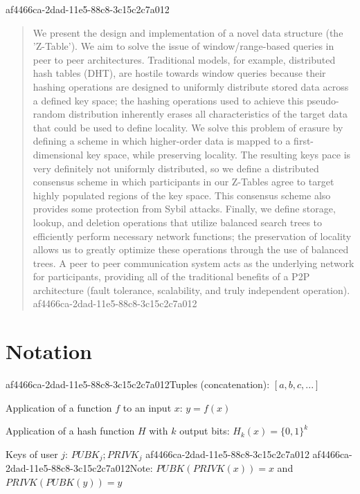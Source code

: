\documentclass[12pt]{article}
\begin{document}
af4466ca-2dad-11e5-88c8-3c15c2c7a012
\maketitle

\begin{abstract}
We present the design and implementation of a novel data structure (the 'Z-Table'). We aim to solve the issue of window/range-based queries in peer to peer architectures. Traditional models, for example,  distributed hash tables (DHT), are hostile towards window queries because their hashing operations are designed to uniformly distribute stored data across a defined key space; the hashing operations used to achieve this pseudo-random distribution inherently erases all characteristics of the target data that could be used to define locality. We solve this problem of erasure by defining a scheme in which higher-order data is mapped to a first-dimensional key space, while preserving locality. The resulting keys pace is very definitely not uniformly distributed, so we define a distributed consensus scheme in which participants in our Z-Tables agree to target highly populated regions of the key space. This consensus scheme also provides some protection from Sybil attacks. Finally, we define storage, lookup, and deletion operations that utilize balanced search trees to efficiently perform necessary network functions; the preservation of locality allows us to greatly optimize these operations through the use of balanced trees. A peer to peer communication system acts as the underlying network for participants, providing all of the traditional benefits of a P2P architecture (fault tolerance, scalability, and truly independent operation).
af4466ca-2dad-11e5-88c8-3c15c2c7a012\end{abstract}

\section{Notation}

af4466ca-2dad-11e5-88c8-3c15c2c7a012Tuples (concatenation): $[a,b,c,...]$

Application of a function $f$ to an input $x$: $y=f(x)$

Application of a hash function $H$ with $k$ output bits: $H_{k}(x) = \{0,1\}^k$

Keys of user $j$: $ PUBK_j; PRIVK_j $
af4466ca-2dad-11e5-88c8-3c15c2c7a012
af4466ca-2dad-11e5-88c8-3c15c2c7a012Note: $PUBK(PRIVK(x)) = x$ and $PRIVK(PUBK(y)) = y$~
\end{document}
